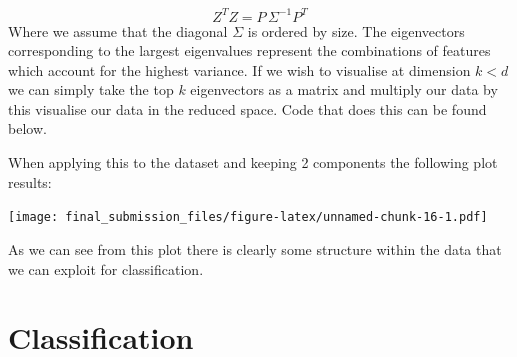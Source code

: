 \documentclass[]{article}
\newenvironment{Shaded}{\begin{snugshade}}{\end{snugshade}}
\newcommand{\KeywordTok}[1]{\textcolor[rgb]{0.13,0.29,0.53}{\textbf{#1}}}
\newcommand{\DataTypeTok}[1]{\textcolor[rgb]{0.13,0.29,0.53}{#1}}
\newcommand{\DecValTok}[1]{\textcolor[rgb]{0.00,0.00,0.81}{#1}}
\newcommand{\StringTok}[1]{\textcolor[rgb]{0.31,0.60,0.02}{#1}}
\newcommand{\OtherTok}[1]{\textcolor[rgb]{0.56,0.35,0.01}{#1}}
\newcommand{\ControlFlowTok}[1]{\textcolor[rgb]{0.13,0.29,0.53}{\textbf{#1}}}
\newcommand{\OperatorTok}[1]{\textcolor[rgb]{0.81,0.36,0.00}{\textbf{#1}}}
\newcommand{\NormalTok}[1]{#1}
\begin{document}
\[
Z^{T}Z = P \,\Sigma^{-1}P^{T}
\] Where we assume that the diagonal \(\Sigma\) is ordered by size. The
eigenvectors corresponding to the largest eigenvalues represent the
combinations of features which account for the highest variance. If we
wish to visualise at dimension \(k < d\) we can simply take the top
\(k\) eigenvectors as a matrix and multiply our data by this visualise
our data in the reduced space. Code that does this can be found below.

\begin{Shaded}
\end{Shaded}

When applying this to the dataset and keeping 2 components the following
plot results:

\texttt{[image: final\_submission\_files/figure-latex/unnamed-chunk-16-1.pdf]}

As we can see from this plot there is clearly some structure within the
data that we can exploit for classification.

\newpage

\section{Classification}\label{classification}
\end{document}
